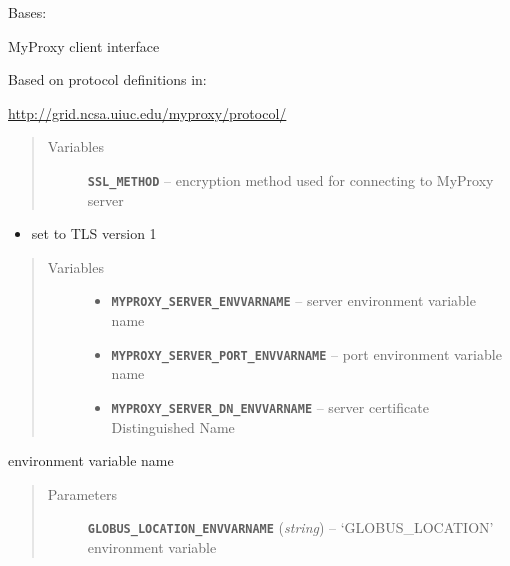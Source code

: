 \documentclass[letterpaper,10pt,english]{sphinxmanual}
\begin{document}
\begin{fulllineitems}
\label{client:myproxy.client.MyProxyClient}
Bases: 

MyProxy client interface

Based on protocol definitions in:

\href{http://grid.ncsa.uiuc.edu/myproxy/protocol/}{http://grid.ncsa.uiuc.edu/myproxy/protocol/}
\begin{quote}\begin{description}
\item[{Variables}] \leavevmode
\textbf{\texttt{SSL\_METHOD}} -- encryption method used for connecting to MyProxy server

\end{description}\end{quote}
\begin{itemize}
\item {} 
set to TLS version 1

\end{itemize}
\begin{quote}\begin{description}
\item[{Variables}] \leavevmode\begin{itemize}
\item {} 
\textbf{\texttt{MYPROXY\_SERVER\_ENVVARNAME}} -- server environment variable name

\item {} 
\textbf{\texttt{MYPROXY\_SERVER\_PORT\_ENVVARNAME}} -- port environment variable name

\item {} 
\textbf{\texttt{MYPROXY\_SERVER\_DN\_ENVVARNAME}} -- server certificate Distinguished Name

\end{itemize}

\end{description}\end{quote}

environment variable name
\begin{quote}\begin{description}
\item[{Parameters}] \leavevmode
\textbf{\texttt{GLOBUS\_LOCATION\_ENVVARNAME}} (\emph{string}) -- `GLOBUS\_LOCATION' environment variable

\end{description}\end{quote}


\end{fulllineitems}
\end{document}
